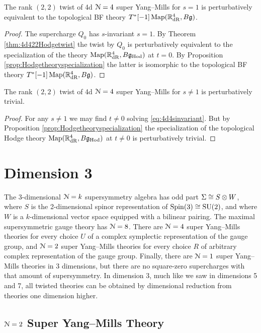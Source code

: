 \documentclass[10pt, oneside]{article}
\newcommand{\Hod}{\mathrm{Hod}}
\begin{document}
\begin{corollary}
The rank $(2, 2)$ twist of 4d $\mathcal N=4$ super Yang--Mills for $s=1$ is perturbatively equivalent to the topological BF theory $T^*[-1]\operatorname{Map}(\mathbb R^4_{\mathrm{dR}}, B\mathfrak g)$.
\end{corollary}
\begin{proof}
The supercharge $Q_0$ has $s$-invariant $s=1$. By Theorem \ref{thm:4d422Hodgetwist} the twist by $Q_0$ is perturbatively equivalent to the specialization of the theory $\map(\RR^4_{\mathrm{dR}}, B\fg_{\Hod})$ at $t=0$. By Proposition \ref{prop:Hodgetheoryspecialization} the latter is isomorphic to the topological BF theory $T^*[-1]\operatorname{Map}(\mathbb R^4_{\mathrm{dR}}, B\mathfrak g)$.
\end{proof}

\begin{corollary}
The rank $(2, 2)$ twist of 4d $\mathcal N=4$ super Yang--Mills for $s\neq 1$ is perturbatively trivial.
\end{corollary}
\begin{proof}
For any $s\neq 1$ we may find $t\neq 0$ solving \eqref{eq:4d4sinvariant}. But by Proposition \ref{prop:Hodgetheoryspecialization} the specialization of the topological Hodge theory $\map(\RR^4_{\mathrm{dR}}, B\fg_{\Hod})$ at $t\neq 0$ is perturbatively trivial.
\end{proof}

\section{Dimension 3}
The 3-dimensional $\mathcal{N}=k$ supersymmetry algebra has odd part $\Sigma \cong S \otimes W$, where $S$ is the 2-dimensional spinor representation of $\mathrm{Spin}(3) \cong \mathrm{SU}(2)$, and where $W$ is a $k$-dimensional vector space equipped with a bilinear pairing.  The maximal supersymmetric gauge theory has $\mathcal{N}=8$.  There are $\mathcal{N}=4$ super Yang--Mills theories for every choice $U$ of a complex symplectic representation of the gauge group, and $\mathcal{N}=2$ super Yang--Mills theories for every choice $R$ of arbitrary complex representation of the gauge group. Finally, there are $\mathcal N=1$ super Yang--Mills theories in 3 dimensions, but there are no square-zero supercharges with that amount of supersymmetry. In dimension 3, much like we saw in dimensions 5 and 7, all twisted theories can be obtained by dimensional reduction from theories one dimension higher.

\subsection{\texorpdfstring{$\mathcal N = 2$}{N=2} Super Yang--Mills Theory}
\label{sect:3d_2_section}
\end{document}
